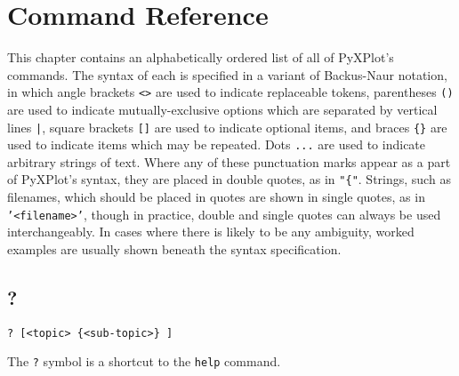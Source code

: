 %
%
%
%
%



\chapter{Command Reference}
\label{ch:reference}

This chapter contains an alphabetically ordered list of all of PyXPlot's
commands. The syntax of each is specified in a variant of Backus-Naur notation,
in which angle brackets {\tt <>} are used to indicate replaceable tokens,
parentheses {\tt ()} are used to indicate mutually-exclusive options which are
separated by vertical lines {\tt |}, square brackets {\tt []} are used to
indicate optional items, and braces {\tt \{\}} are used to indicate items which
may be repeated. Dots {\tt ...} are used to indicate arbitrary strings of text.
Where any of these punctuation marks appear as a part of PyXPlot's syntax, they
are placed in double quotes, as in {\tt "\{"}. Strings, such as filenames,
which should be placed in quotes are shown in single quotes, as in {\tt
'<filename>'}, though in practice, double and single quotes can always be used
interchangeably. In cases where there is likely to be any ambiguity, worked
examples are usually shown beneath the syntax specification.

\section{?}

\begin{verbatim}
? [<topic> {<sub-topic>} ]
\end{verbatim}

The {\tt ?} symbol is a shortcut to the {\tt help} command.


